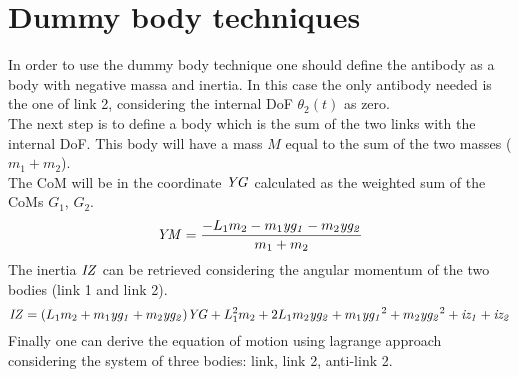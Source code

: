 \section{Dummy body techniques}
%
In order to use the dummy body technique one should define the antibody as a body with negative massa and inertia. In this case the only antibody needed is the one of link 2, considering the internal DoF $\theta_2(t)$ as zero.\\
The next step is to define a body which is the sum of the two links with the internal DoF. This body will have a mass $M$ equal to the sum of the two masses ($m_1+m_2$).\\
The CoM will be in the coordinate $\it YG$ calculated as the weighted sum of the CoMs $G_1$, $G_2$.
%
\begin{equation}
    {\it YM} = \frac{-L_1 m_2-m_1 {\it yg_1}-m_2 {\it yg_2}}{m_1+m_2}
\end{equation}
%
The inertia $\it IZ$ can be retrieved considering the angular momentum of the two bodies (link 1 and link 2).
%
\begin{equation}
    {\it IZ} =  (L_1 m_2+m_1 {\it yg_1}+m_2 {\it yg_2}) {\it YG}+L_1^2 m_2+2 L_1 m_2 {\it yg_2}+m_1 {\it yg_1}^2+m_2{\it yg_2}^2+{\it iz_1}+{\it iz_2}
\end{equation}
%
Finally one can derive the equation of motion using lagrange approach considering the system of three bodies: link, link 2, anti-link 2.
%
\footnotesize
